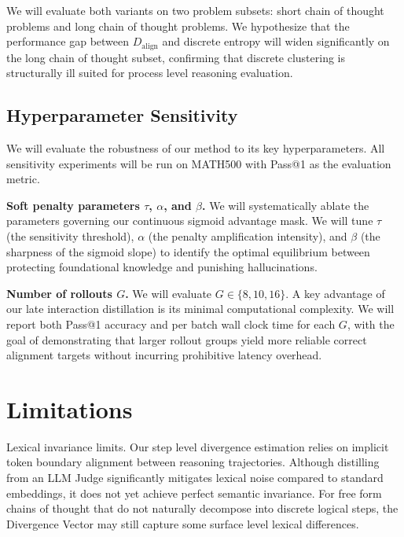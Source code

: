 \documentclass[conference]{IEEEtran}
\begin{document}
We will evaluate both variants on two problem subsets: short chain of thought problems and long chain of thought problems. We hypothesize that the performance gap between $D_{\mathrm{align}}$ and discrete entropy will widen significantly on the long chain of thought subset, confirming that discrete clustering is structurally ill suited for process level reasoning evaluation.

\subsection{Hyperparameter Sensitivity}

We will evaluate the robustness of our method to its key hyperparameters. All sensitivity experiments will be run on MATH500 with Pass@1 as the evaluation metric.

\textbf{Soft penalty parameters $\tau$, $\alpha$, and $\beta$.} We will systematically ablate the parameters governing our continuous sigmoid advantage mask. We will tune $\tau$ (the sensitivity threshold), $\alpha$ (the penalty amplification intensity), and $\beta$ (the sharpness of the sigmoid slope) to identify the optimal equilibrium between protecting foundational knowledge and punishing hallucinations.

\textbf{Number of rollouts $G$.} We will evaluate $G \in \{8, 10, 16\}$. A key advantage of our late interaction distillation is its minimal computational complexity. We will report both Pass@1 accuracy and per batch wall clock time for each $G$, with the goal of demonstrating that larger rollout groups yield more reliable correct alignment targets without incurring prohibitive latency overhead.

\section{Limitations}

Lexical invariance limits. Our step level divergence estimation relies on implicit token boundary alignment between reasoning trajectories. Although distilling from an LLM Judge significantly mitigates lexical noise compared to standard embeddings, it does not yet achieve perfect semantic invariance. For free form chains of thought that do not naturally decompose into discrete logical steps, the Divergence Vector may still capture some surface level lexical differences.
\end{document}
